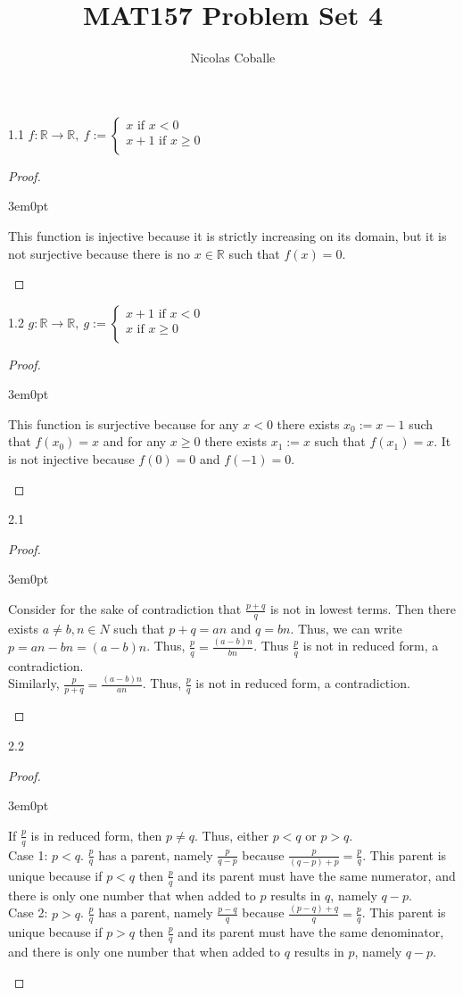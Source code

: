 \documentclass[11pt]{article}
\title{MAT157 Problem Set 4}
\author{Nicolas Coballe}
\newcommand{\R}{\mathbb{R}}
\newenvironment{myproof}
{\begin{proof} \begin{adjustwidth}{3em}{0pt}$ $\par\nobreak\ignorespaces}
{\end{adjustwidth} \end{proof}}
\begin{document}
\maketitle
\begin{flushleft}


1.1 $f:\R \rightarrow \R, \ f := \begin{cases}
x \text{ if } x < 0\\
x + 1 \text{ if } x \geq 0\\
\end{cases}$
\begin{myproof}
This function is injective because it is strictly increasing on its domain, but it is not surjective because there is no $x \in \R$ such that $f(x) = 0$.
\end{myproof}

1.2 $g:\R \rightarrow \R, \ g := \begin{cases}
x + 1 \text{ if } x < 0 \\
x \text{ if } x \geq 0\\
\end{cases}$
\begin{myproof}
This function is surjective because for any $x < 0$ there exists $x_0 := x-1$ such that $f(x_0) = x$ and for any $x \geq 0$ there exists $x_1 := x$ such that $f(x_1) = x$. It is not injective because $f(0) = 0$ and $f(-1) = 0$. 
\end{myproof}

\newpage

2.1

\begin{myproof}
Consider for the sake of contradiction that $\frac{p+q}{q}$ is not in lowest terms. Then there exists $a \neq b, n \in N$ such that $p + q = an$ and $q = bn$. Thus, we can write $p = an -bn = (a-b)n$. Thus, $\frac{p}{q} = \frac{(a-b)n}{bn}$. Thus $\frac{p}{q}$ is not in reduced form, a contradiction. \\
\bigskip
Similarly, $\frac{p}{p+q} = \frac{(a-b)n}{an}$. Thus, $\frac{p}{q}$ is not in reduced form, a contradiction.
\end{myproof}

2.2

\begin{myproof}
If $\frac{p}{q}$ is in reduced form, then $p \neq q$. Thus, either $p<q$ or $p>q$. \\
\bigskip
Case 1: $p<q$. $\frac{p}{q}$ has a parent, namely $\frac{p}{q-p}$ because $\frac{p}{(q-p)+p} = \frac{p}{q}$. This parent is unique because if $p<q$ then $\frac{p}{q}$ and its parent must have the same numerator, and there is only one number that when added to $p$ results in $q$, namely $q-p$. \\
Case 2: $p>q$. $\frac{p}{q}$ has a parent, namely $\frac{p-q}{q}$ because $\frac{(p-q)+q}{q} = \frac{p}{q}$. This parent is unique because if $p>q$ then $\frac{p}{q}$ and its parent must have the same denominator, and there is only one number that when added to $q$ results in $p$, namely $q-p$.
\end{myproof}


\end{flushleft}
\end{document}
